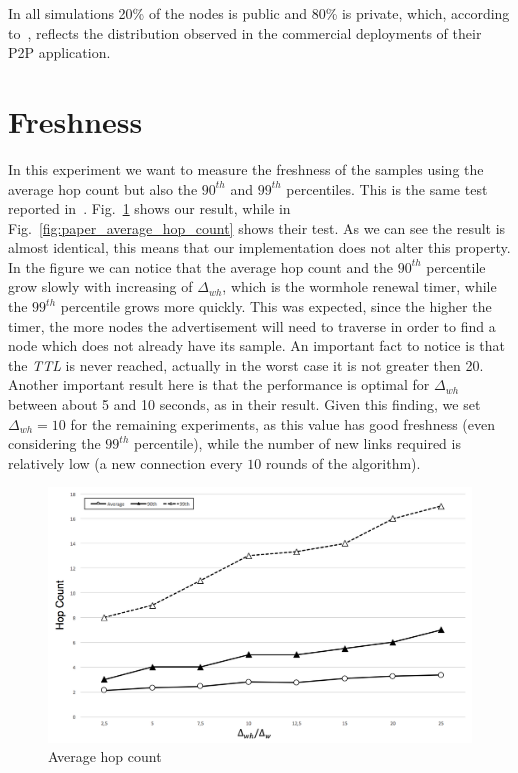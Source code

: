 In all simulations 20\% of the nodes is public and 80\% is private, which, according to~\cite{wormhole}, reflects the distribution observed in the commercial deployments of their P2P application.

\section{Freshness}
\label{sec:eval_freshness}
In this experiment we want to measure the freshness of the samples using the average hop count but also the \textit{$90^{th}$} and \textit{$99^{th}$} percentiles. This is the same test reported in~\cite{wormhole}. Fig.~\ref{fig:my_average_hop_count} shows our result, while in Fig.~\ref{fig:paper_average_hop_count} shows their test. As we can see the result is almost identical, this means that our implementation does not alter this property. In the figure we can notice that the average hop count and the $90^{th}$ percentile grow slowly with increasing of $\Delta_{wh}$, which is the wormhole renewal timer, while the $99^{th}$ percentile grows more quickly. This was expected, since the higher the timer, the more nodes the advertisement will need to traverse in order to find a node which does not already have its sample. An important fact to notice is that the \textit{TTL} is never reached, actually in the worst case it is not greater then 20. Another important result here is that the performance is optimal for $\Delta_{wh}$  between about 5 and 10 seconds, as in their result. Given this finding, we set $\Delta_{wh} = 10$ for the remaining experiments, as this value has good freshness (even considering the $99^{th}$ percentile), while the number of new links required is relatively low (a new connection every $10$ rounds of the algorithm). 

\begin{figure}[ht]
  \centering
  \includegraphics[keepaspectratio=true, width=\textwidth]{images/average_hop_count}\caption{Average hop count}
  \label{fig:my_average_hop_count}
\end{figure}


